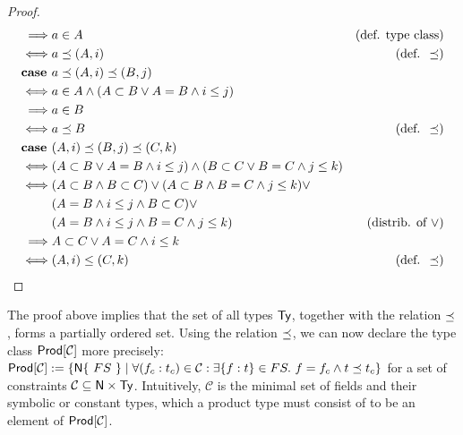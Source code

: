 \begin{proof}
\begin{align*}
		\implies       & a \in A                                                                               & (\text{def. type class})   \\
		\iff           & a \preceq (A, i)                                                                      & (\text{def. } \preceq)     \\
		\textbf{case } & a \preceq (A,i) \preceq (B,j)                                                                                      \\
		\iff           & a \in A \land (A \subset B \lor  A = B \land i \leq j)                                                             \\
		\implies       & a \in B                                                                                                            \\
		\iff           & a \preceq B                                                                           & (\text{def. } \preceq)     \\
		\textbf{case } & (A,i) \preceq (B,j) \preceq (C,k)                                                                                  \\
		\iff           & (A \subset B \lor A = B \land i \leq j) \land (B \subset C \lor B = C \land j \leq k)                              \\
		\iff           & (A \subset B \land B \subset C) \lor (A \subset B \land B = C \land j \leq k) \lor                                 \\
		               & (A = B \land i \leq j \land B \subset C) \lor                                                                      \\
		               & (A = B \land i \leq j \land B = C \land j \leq k)                                     & (\text{distrib. of } \lor) \\
		\implies       & A \subset C \lor A = C \land i \leq k                                                                              \\
		\iff           & (A,i) \leq (C,k)                                                                      & (\text{def. } \preceq)
	\end{align*}
\end{proof}

The proof above implies that the set of all types $\mathsf{Ty}$, together with the relation $\preceq$, forms a partially ordered set. Using the relation $\preceq$, we can now declare the type class $\mathsf{Prod[\mathcal{C}]}$ more precisely: $\mathsf{Prod[\mathcal{C}]} := \{ \mathsf{N} \{\ FS\ \} \mid \forall (f_c : t_c) \in \mathcal{C} : \exists \{ f : t \} \in FS .\ f = f_c \land t \preceq t_c \}$ for a set of constraints $\mathcal{C} \subseteq \mathsf{N} \times \mathsf{Ty}$. Intuitively, $\mathcal{C}$ is the minimal set of fields and their symbolic or constant types, which a product type must consist of to be an element of $\mathsf{Prod[\mathcal{C}]}$.

